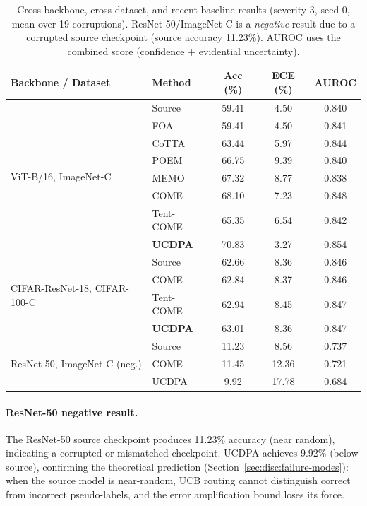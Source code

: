 \begin{table}[h]
\centering
\small
\caption{Cross-backbone, cross-dataset, and recent-baseline results (severity 3, seed 0, mean over 19 corruptions). ResNet-50/ImageNet-C is a \emph{negative} result due to a corrupted source checkpoint (source accuracy 11.23\%). AUROC uses the combined score (confidence + evidential uncertainty).}
\label{tab:cross-backbone-full}
\begin{tabular}{llccc}
\toprule
Backbone / Dataset & Method & Acc (\%) & ECE (\%) & AUROC \\
\midrule
\multirow{8}{*}{ViT-B/16, ImageNet-C}
  & Source & 59.41 & 4.50 & 0.840 \\
  & FOA & 59.41 & 4.50 & 0.841 \\
  & CoTTA & 63.44 & 5.97 & 0.844 \\
  & POEM & 66.75 & 9.39 & 0.840 \\
  & MEMO & 67.32 & 8.77 & 0.838 \\
  & COME & 68.10 & 7.23 & 0.848 \\
  & Tent-COME & 65.35 & 6.54 & 0.842 \\
  & \textbf{UCDPA} & 70.83 & 3.27 & 0.854 \\
\midrule
\multirow{4}{*}{CIFAR-ResNet-18, CIFAR-100-C}
  & Source & 62.66 & 8.36 & 0.846 \\
  & COME & 62.84 & 8.37 & 0.846 \\
  & Tent-COME & 62.94 & 8.45 & 0.847 \\
  & \textbf{UCDPA} & 63.01 & 8.36 & 0.847 \\
\midrule
\multirow{3}{*}{ResNet-50, ImageNet-C (neg.)}
  & Source & 11.23 & 8.56 & 0.737 \\
  & COME & 11.45 & 12.36 & 0.721 \\
  & UCDPA & 9.92 & 17.78 & 0.684 \\
\bottomrule
\end{tabular}
\end{table}

\paragraph{ResNet-50 negative result.}
The ResNet-50 source checkpoint produces 11.23\% accuracy (near random), indicating a corrupted or mismatched checkpoint. UCDPA achieves 9.92\% (below source), confirming the theoretical prediction (Section~\ref{sec:disc:failure-modes}): when the source model is near-random, UCB routing cannot distinguish correct from incorrect pseudo-labels, and the error amplification bound loses its force.

